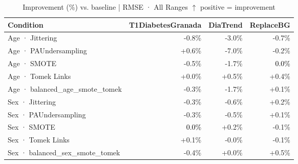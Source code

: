 \begin{table}[htbp]
\centering
\small
\caption{Improvement (\%) vs. baseline  |  RMSE · All Ranges  $\uparrow$ positive = improvement}
\label{tab:delta_rmse_entire_family_mechanism_guided}
\begin{tabular}{lrrr}
\toprule
\textbf{Condition} & \textbf{T1DiabetesGranada} & \textbf{DiaTrend} & \textbf{ReplaceBG} \\
\midrule
Age · Jittering & \textcolor{BrickRed}{-0.8\%} & \textcolor{BrickRed}{-3.0\%} & \textcolor{BrickRed}{-0.7\%} \\
Age · PAUndersampling & \textcolor{OliveGreen}{+0.6\%} & \textcolor{BrickRed}{-7.0\%} & \textcolor{BrickRed}{-0.2\%} \\
Age · SMOTE & \textcolor{BrickRed}{-0.5\%} & \textcolor{BrickRed}{-1.7\%} & \textcolor{black}{0.0\%} \\
Age · Tomek Links & \textcolor{OliveGreen}{+0.0\%} & \textcolor{OliveGreen}{+0.5\%} & \textcolor{OliveGreen}{+0.4\%} \\
Age · balanced_age_smote_tomek & \textcolor{BrickRed}{-0.3\%} & \textcolor{BrickRed}{-1.7\%} & \textcolor{OliveGreen}{+0.1\%} \\
\midrule
Sex · Jittering & \textcolor{BrickRed}{-0.3\%} & \textcolor{BrickRed}{-0.6\%} & \textcolor{OliveGreen}{+0.2\%} \\
Sex · PAUndersampling & \textcolor{BrickRed}{-0.3\%} & \textcolor{BrickRed}{-0.5\%} & \textcolor{OliveGreen}{+0.1\%} \\
Sex · SMOTE & \textcolor{black}{0.0\%} & \textcolor{OliveGreen}{+0.2\%} & \textcolor{BrickRed}{-0.1\%} \\
Sex · Tomek Links & \textcolor{OliveGreen}{+0.1\%} & \textcolor{BrickRed}{-0.0\%} & \textcolor{BrickRed}{-0.1\%} \\
Sex · balanced_sex_smote_tomek & \textcolor{BrickRed}{-0.4\%} & \textcolor{OliveGreen}{+0.0\%} & \textcolor{OliveGreen}{+0.5\%} \\
\bottomrule
\end{tabular}
\end{table}